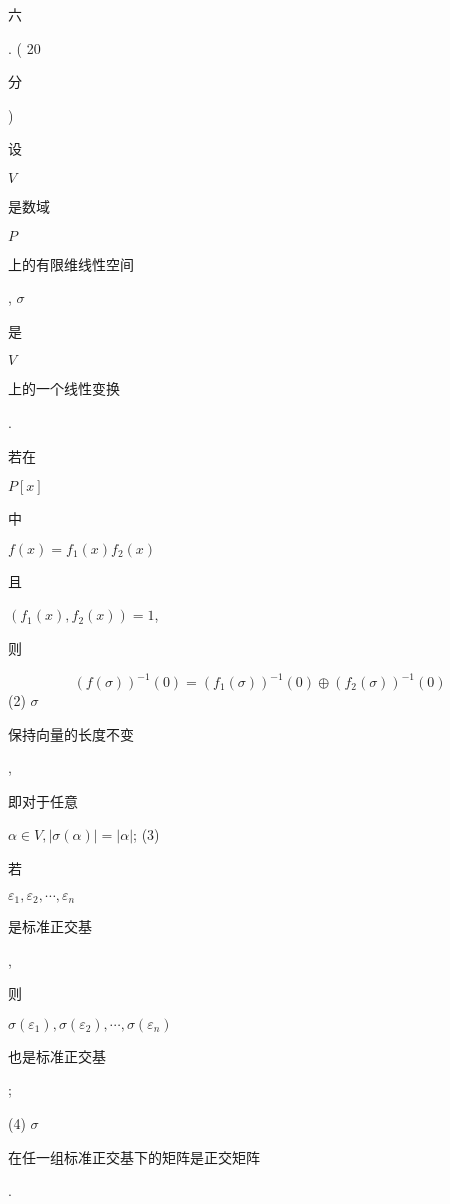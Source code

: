 \documentclass[10pt]{article}
\begin{document}
\begin{CJK}{UTF8}{mj}六\end{CJK}. ( 20 \begin{CJK}{UTF8}{mj}分\end{CJK}) \begin{CJK}{UTF8}{mj}设\end{CJK} $V$ \begin{CJK}{UTF8}{mj}是数域\end{CJK} $P$ \begin{CJK}{UTF8}{mj}上的有限维线性空间\end{CJK}, $\sigma$ \begin{CJK}{UTF8}{mj}是\end{CJK} $V$ \begin{CJK}{UTF8}{mj}上的一个线性变换\end{CJK}. \begin{CJK}{UTF8}{mj}若在\end{CJK} $P[x]$ \begin{CJK}{UTF8}{mj}中\end{CJK} $f(x)=f_{1}(x) f_{2}(x)$ \begin{CJK}{UTF8}{mj}且\end{CJK} $\left(f_{1}(x), f_{2}(x)\right)=1$, \begin{CJK}{UTF8}{mj}则\end{CJK}
$$
(f(\sigma))^{-1}(0)=\left(f_{1}(\sigma)\right)^{-1}(0) \oplus\left(f_{2}(\sigma)\right)^{-1}(0)
$$
(2) $\sigma$ \begin{CJK}{UTF8}{mj}保持向量的长度不变\end{CJK}, \begin{CJK}{UTF8}{mj}即对于任意\end{CJK} $\alpha \in V,|\sigma(\alpha)|=|\alpha|$; (3) \begin{CJK}{UTF8}{mj}若\end{CJK} $\varepsilon_{1}, \varepsilon_{2}, \cdots, \varepsilon_{n}$ \begin{CJK}{UTF8}{mj}是标准正交基\end{CJK}, \begin{CJK}{UTF8}{mj}则\end{CJK} $\sigma\left(\varepsilon_{1}\right), \sigma\left(\varepsilon_{2}\right), \cdots, \sigma\left(\varepsilon_{n}\right)$ \begin{CJK}{UTF8}{mj}也是标准正交基\end{CJK};

(4) $\sigma$ \begin{CJK}{UTF8}{mj}在任一组标准正交基下的矩阵是正交矩阵\end{CJK}.
\end{document}
